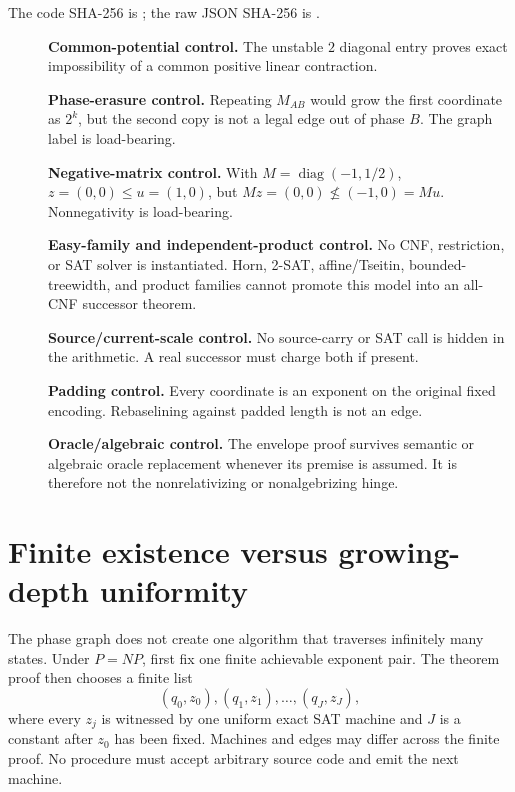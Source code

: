 \documentclass[11pt]{article}
\begin{document}
The code SHA-256 is
;
the raw JSON SHA-256 is
.

\begin{description}
\item[] \textbf{Common-potential control.} The unstable \(2\) diagonal entry
proves exact impossibility of a common positive linear contraction.
\item[] \textbf{Phase-erasure control.} Repeating \(M_{AB}\) would grow the
first coordinate as \(2^k\), but the second copy is not a legal edge out of
phase \(B\).  The graph label is load-bearing.
\item[] \textbf{Negative-matrix control.} With
\(M=\operatorname{diag}(-1,1/2)\), \(z=(0,0)\le u=(1,0)\), but
\(Mz=(0,0)\not\le(-1,0)=Mu\).  Nonnegativity is load-bearing.
\item[] \textbf{Easy-family and independent-product control.} No CNF,
restriction, or SAT solver is instantiated.  Horn, 2-SAT, affine/Tseitin,
bounded-treewidth, and product families cannot promote this model into an
all-CNF successor theorem.
\item[] \textbf{Source/current-scale control.} No source-carry or SAT call is
hidden in the arithmetic.  A real successor must charge both if present.
\item[] \textbf{Padding control.} Every coordinate is an exponent on the
original fixed encoding.  Rebaselining against padded length is not an edge.
\item[] \textbf{Oracle/algebraic control.} The envelope proof survives
semantic or algebraic oracle replacement whenever its premise is assumed.
It is therefore not the nonrelativizing or nonalgebrizing hinge.
\end{description}

\section{Finite existence versus growing-depth uniformity}
The phase graph does not create one algorithm that traverses infinitely many
states.  Under \(P=NP\), first fix one finite achievable exponent pair.
The theorem proof then chooses a finite list
\[
(q_0,z_0),(q_1,z_1),\ldots,(q_J,z_J),
\]
where every \(z_j\) is witnessed by one uniform exact SAT machine and
\(J\) is a constant after \(z_0\) has been fixed.  Machines and edges may
differ across the finite proof.  No procedure must accept arbitrary source
code and emit the next machine.
\end{document}
